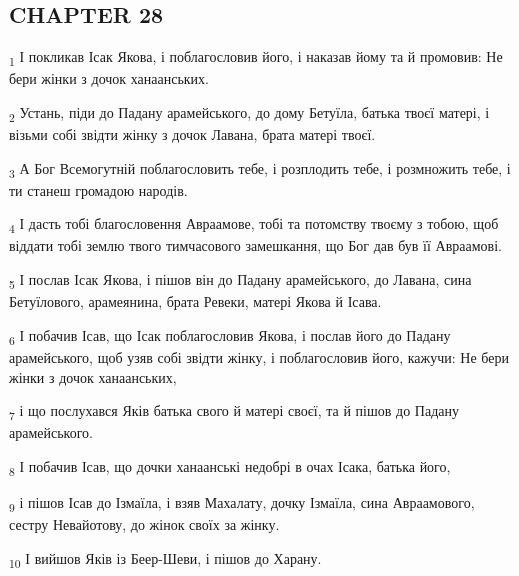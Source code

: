 \subsection{CHAPTER 28}
\begin{tcolorbox}
\textsubscript{1} І покликав Ісак Якова, і поблагословив його, і наказав йому та й промовив: Не бери жінки з дочок ханаанських.
\end{tcolorbox}
\begin{tcolorbox}
\textsubscript{2} Устань, піди до Падану арамейського, до дому Бетуїла, батька твоєї матері, і візьми собі звідти жінку з дочок Лавана, брата матері твоєї.
\end{tcolorbox}
\begin{tcolorbox}
\textsubscript{3} А Бог Всемогутній поблагословить тебе, і розплодить тебе, і розмножить тебе, і ти станеш громадою народів.
\end{tcolorbox}
\begin{tcolorbox}
\textsubscript{4} І дасть тобі благословення Авраамове, тобі та потомству твоєму з тобою, щоб віддати тобі землю твого тимчасового замешкання, що Бог дав був її Авраамові.
\end{tcolorbox}
\begin{tcolorbox}
\textsubscript{5} І послав Ісак Якова, і пішов він до Падану арамейського, до Лавана, сина Бетуїлового, арамеянина, брата Ревеки, матері Якова й Ісава.
\end{tcolorbox}
\begin{tcolorbox}
\textsubscript{6} І побачив Ісав, що Ісак поблагословив Якова, і послав його до Падану арамейського, щоб узяв собі звідти жінку, і поблагословив його, кажучи: Не бери жінки з дочок ханаанських,
\end{tcolorbox}
\begin{tcolorbox}
\textsubscript{7} і що послухався Яків батька свого й матері своєї, та й пішов до Падану арамейського.
\end{tcolorbox}
\begin{tcolorbox}
\textsubscript{8} І побачив Ісав, що дочки ханаанські недобрі в очах Ісака, батька його,
\end{tcolorbox}
\begin{tcolorbox}
\textsubscript{9} і пішов Ісав до Ізмаїла, і взяв Махалату, дочку Ізмаїла, сина Авраамового, сестру Невайотову, до жінок своїх за жінку.
\end{tcolorbox}
\begin{tcolorbox}
\textsubscript{10} І вийшов Яків із Беер-Шеви, і пішов до Харану.
\end{tcolorbox}
